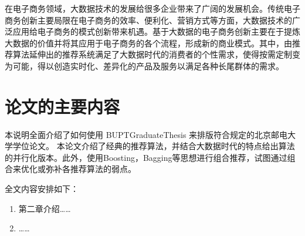在电子商务领域，大数据技术的发展给很多企业带来了广阔的发展机会。传统电子商务创新主要局限在电子商务的效率、便利化、营销方式等方面，大数据技术的广泛应用给电子商务的模式创新带来机遇。基于大数据的电子商务创新主要在于提炼大数据的价值并将其应用于电子商务的各个流程，形成新的商业模式\cite{大数据背景下电子商务的价值创造与模式创新}。其中，由推荐算法延伸出的推荐系统满足了大数据时代的消费者的个性需求，使得按需定制变为可能，得以创造实时化、差异化的产品及服务以满足各种长尾群体的需求。


\section{论文的主要内容}
本说明全面介绍了如何使用 BUPTGraduateThesis 来排版符合规定的北京邮电大学学位论文。
本论文介绍了经典的推荐算法，并结合大数据时代的特点给出算法的并行化版本。此外，使用Boosting，Bagging等思想进行组合推荐，试图通过组合来优化或弥补各推荐算法的弱点。

全文内容安排如下：
\begin{enumerate}
\item 第二章介绍……
\item ……
\end{enumerate}

\ifx\usechapbib\empty
\nocite{BSTcontrol}
\setcounter{NAT@ctr}{0}


\fi

